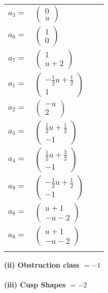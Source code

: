 \documentclass[1p]{elsarticle_modified}
\theoremstyle{definition}
\begin{document}
\begin{tabular}{m{7pt} m{180pt} m{7pt} m{180pt} }
\flushright $a_{3}=$&$\begin{pmatrix}0\\u\end{pmatrix}$ \\
\flushright $a_{6}=$&$\begin{pmatrix}1\\0\end{pmatrix}$ \\
\flushright $a_{7}=$&$\begin{pmatrix}1\\u+2\end{pmatrix}$ \\
\flushright $a_{1}=$&$\begin{pmatrix}-\frac{1}{2} u+\frac{1}{2}\\1\end{pmatrix}$ \\
\flushright $a_{2}=$&$\begin{pmatrix}- u\\2\end{pmatrix}$ \\
\flushright $a_{5}=$&$\begin{pmatrix}\frac{1}{2} u+\frac{1}{2}\\-1\end{pmatrix}$ \\
\flushright $a_{4}=$&$\begin{pmatrix}\frac{1}{2} u+\frac{3}{2}\\-1\end{pmatrix}$ \\
\flushright $a_{9}=$&$\begin{pmatrix}-\frac{1}{2} u+\frac{1}{2}\\-1\end{pmatrix}$ \\
\flushright $a_{8}=$&$\begin{pmatrix}u+1\\- u-2\end{pmatrix}$\\ \flushright $a_{8}=$&$\begin{pmatrix}u+1\\- u-2\end{pmatrix}$\\&\end{tabular}
\flushleft \textbf{(ii) Obstruction class $= -1$}\\~\\
\flushleft \textbf{(iii) Cusp Shapes $= -2$}\\~\\
\end{document}
